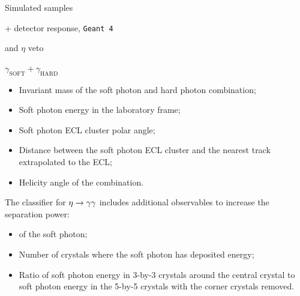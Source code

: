 \documentclass[xcolor=dvipsnames]{beamer}
\begin{document}
\begin{frame}{Simulated samples}
   \centering

   + detector response, \texttt{Geant 4}
\end{frame}

\begin{frame}{\piz and $\eta$ veto}

   \centering\scriptsize

   $\gamma_{\mathrm{SOFT}} + \gamma_{\mathrm{HARD}}$

   \begin{itemize}
      \item Invariant mass of the soft photon and hard photon combination;
      \item Soft photon energy in the laboratory frame;
      \item Soft photon ECL cluster polar angle;
      \item Distance between the soft photon ECL cluster and the nearest track extrapolated to the ECL;
      \item Helicity angle of the combination.
  \end{itemize}

  \vspace{10pt}

  The classifier for $\eta\rightarrow\gamma\gamma$ includes additional observables to increase the separation power:
  \begin{itemize}
      \item \ZMVA of the soft photon;
      \item Number of crystals where the soft photon has deposited energy;
      \item Ratio of soft photon energy in 3-by-3 crystals around the central crystal to soft photon energy in the 5-by-5 crystals with the corner crystals removed.
  \end{itemize}
\end{frame}
\end{document}
